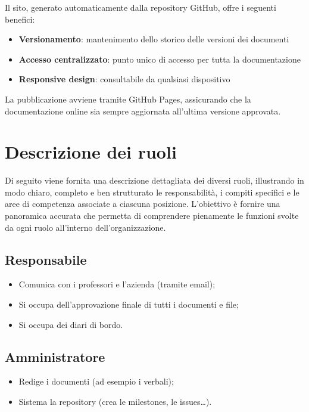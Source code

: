 \documentclass[11pt,a4paper]{article}
\begin{document}
Il sito, generato automaticamente dalla repository GitHub, offre i seguenti benefici:
\begin{itemize}
    \item \textbf{Versionamento}: mantenimento dello storico delle versioni dei documenti
    \item \textbf{Accesso centralizzato}: punto unico di accesso per tutta la documentazione
    \item \textbf{Responsive design}: consultabile da qualsiasi dispositivo
\end{itemize}

La pubblicazione avviene tramite GitHub Pages, assicurando che la documentazione online sia sempre aggiornata all'ultima versione approvata.

\newpage

\section{Descrizione dei ruoli}
Di seguito viene fornita una descrizione dettagliata dei diversi ruoli, illustrando in modo chiaro, completo e ben strutturato le responsabilità, i compiti specifici e le aree di competenza associate a ciascuna posizione. L’obiettivo è fornire una panoramica accurata che permetta di comprendere pienamente le funzioni svolte da ogni ruolo all’interno dell’organizzazione.

\subsection{Responsabile}
\begin{itemize}
    \item Comunica con i professori e l'azienda (tramite email);
    \item Si occupa dell'approvazione finale di tutti i documenti e file;
    \item Si occupa dei diari di bordo.
\end{itemize}

\subsection{Amministratore}
\begin{itemize}
    \item Redige i documenti (ad esempio i verbali);
    \item Sistema la repository (crea le milestones, le issues…).
\end{itemize}
\end{document}
